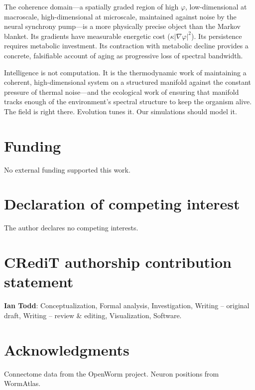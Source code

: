 \documentclass[12pt]{article}
\begin{document}
The coherence domain---a spatially graded region of high $\varphi$, low-dimensional at macroscale, high-dimensional at microscale, maintained against noise by the neural synchrony pump---is a more physically precise object than the Markov blanket. Its gradients have measurable energetic cost ($\kappa |\nabla\varphi|^2$). Its persistence requires metabolic investment. Its contraction with metabolic decline provides a concrete, falsifiable account of aging as progressive loss of spectral bandwidth.

Intelligence is not computation. It is the thermodynamic work of maintaining a coherent, high-dimensional system on a structured manifold against the constant pressure of thermal noise---and the ecological work of ensuring that manifold tracks enough of the environment's spectral structure to keep the organism alive. The field is right there. Evolution tunes it. Our simulations should model it.

\section*{Funding}

No external funding supported this work.

\section*{Declaration of competing interest}

The author declares no competing interests.

\section*{CRediT authorship contribution statement}

\textbf{Ian Todd}: Conceptualization, Formal analysis, Investigation, Writing -- original draft, Writing -- review \& editing, Visualization, Software.

\section*{Acknowledgments}

Connectome data from the OpenWorm project. Neuron positions from WormAtlas.
\end{document}
